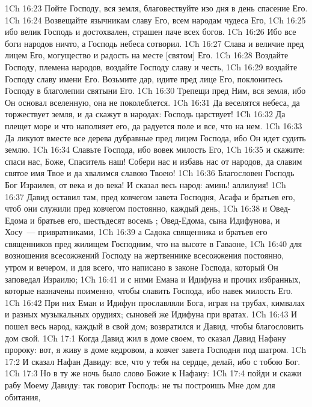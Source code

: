 \vs 1Ch 16:23 Пойте Господу, вся земля, благовествуйте изо дня в день спасение Его.
\vs 1Ch 16:24 Возвещайте язычникам славу Его, всем народам чудеса Его,
\vs 1Ch 16:25 ибо велик Господь и достохвален, страшен паче всех богов.
\vs 1Ch 16:26 Ибо все боги народов ничто, а Господь небеса сотворил.
\vs 1Ch 16:27 Слава и величие пред лицем Его, могущество и радость на месте [святом] Его.
\vs 1Ch 16:28 Воздайте Господу, племена народов, воздайте Господу славу и честь,
\vs 1Ch 16:29 воздайте Господу славу имени Его. Возьмите дар, идите пред лице Его, поклонитесь Господу в благолепии святыни Его.
\vs 1Ch 16:30 Трепещи пред Ним, вся земля, ибо Он основал вселенную, она не поколеблется.
\vs 1Ch 16:31 Да веселятся небеса, да торжествует земля, и да скажут в народах: Господь царствует!
\vs 1Ch 16:32 Да плещет море и что наполняет его, да радуется поле и все, что на нем.
\vs 1Ch 16:33 Да ликуют вместе все дерева дубравные пред лицем Господа, ибо Он идет судить землю.
\vs 1Ch 16:34 Славьте Господа, ибо вовек милость Его,
\vs 1Ch 16:35 и скажите: спаси нас, Боже, Спаситель наш! Собери нас и избавь нас от народов, да славим святое имя Твое и да хвалимся славою Твоею!
\vs 1Ch 16:36 Благословен Господь Бог Израилев, от века и до века! И сказал весь народ: аминь! аллилуия!
\rsbpar\vs 1Ch 16:37 Давид оставил там, пред ковчегом завета Господня, Асафа и братьев его, чтоб они служили пред ковчегом постоянно, каждый день,
\vs 1Ch 16:38 и Овед-Едома и братьев его, шестьдесят восемь ; Овед-Едома, сына Идифунова, и Хосу~--- привратниками,
\vs 1Ch 16:39 а Садока священника и братьев его священников пред жилищем Господним, что на высоте в Гаваоне,
\vs 1Ch 16:40 для возношения всесожжений Господу на жертвеннике всесожжения постоянно, утром и вечером, и для всего, что написано в законе Господа, который Он заповедал Израилю;
\vs 1Ch 16:41 и с ними Емана и Идифуна и прочих избранных, которые назначены поименно, чтобы славить Господа, ибо навек милость Его.
\vs 1Ch 16:42 При них Еман и Идифун прославляли Бога, играя на трубах, кимвалах и разных музыкальных орудиях; сыновей же Идифуна  при вратах.
\rsbpar\vs 1Ch 16:43 И пошел весь народ, каждый в свой дом; возвратился и Давид, чтобы благословить дом свой.
\vs 1Ch 17:1 Когда Давид жил в доме своем, то сказал Давид Нафану пророку: вот, я живу в доме кедровом, а ковчег завета Господня под шатром.
\vs 1Ch 17:2 И сказал Нафан Давиду: все, что у тебя на сердце, делай, ибо с тобою Бог.
\rsbpar\vs 1Ch 17:3 Но в ту же ночь было слово Божие к Нафану:
\vs 1Ch 17:4 пойди и скажи рабу Моему Давиду: так говорит Господь: не ты построишь Мне дом для обитания,
